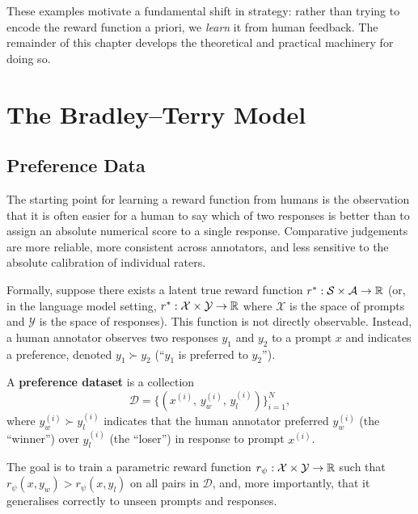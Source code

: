 These examples motivate a fundamental shift in strategy: rather than trying to encode the reward function a priori, we \emph{learn} it from human feedback. The remainder of this chapter develops the theoretical and practical machinery for doing so.

\section{The Bradley--Terry Model}
\label{sec:bradley-terry}

\subsection{Preference Data}

The starting point for learning a reward function from humans is the observation that it is often easier for a human to say which of two responses is better than to assign an absolute numerical score to a single response. Comparative judgements are more reliable, more consistent across annotators, and less sensitive to the absolute calibration of individual raters.

Formally, suppose there exists a latent true reward function $r^* : \mathcal{S} \times \mathcal{A} \to \mathbb{R}$ (or, in the language model setting, $r^* : \mathcal{X} \times \mathcal{Y} \to \mathbb{R}$ where $\mathcal{X}$ is the space of prompts and $\mathcal{Y}$ is the space of responses). This function is not directly observable. Instead, a human annotator observes two responses $y_1$ and $y_2$ to a prompt $x$ and indicates a preference, denoted $y_1 \succ y_2$ (``$y_1$ is preferred to $y_2$'').

\begin{definition}
\label{def:preference-dataset}
A \textbf{preference dataset} is a collection
\[
\mathcal{D} = \bigl\{(x^{(i)},\, y_w^{(i)},\, y_l^{(i)})\bigr\}_{i=1}^{N},
\]
where $y_w^{(i)} \succ y_l^{(i)}$ indicates that the human annotator preferred $y_w^{(i)}$ (the ``winner'') over $y_l^{(i)}$ (the ``loser'') in response to prompt $x^{(i)}$.
\end{definition}

The goal is to train a parametric reward function $r_\psi : \mathcal{X} \times \mathcal{Y} \to \mathbb{R}$ such that $r_\psi(x, y_w) > r_\psi(x, y_l)$ on all pairs in $\mathcal{D}$, and, more importantly, that it generalises correctly to unseen prompts and responses.

